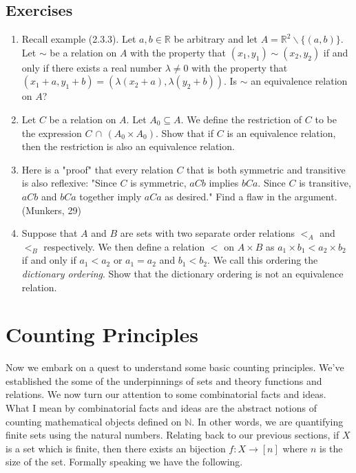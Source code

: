 \documentclass[12pt]{book}
\def\N{{\mathbb{N}}}
\def\R{{\mathbb{R}}}
\begin{document}
\subsection*{Exercises}
\begin{enumerate}[nolistsep]
\item Recall example (2.3.3). Let $a,b\in\R$ be arbitrary and let $A=\R^2\backslash\{(a,b)\}$. Let $\sim$ be a relation on $A$ with the property that $(x_1,y_1)\sim(x_2,y_2)$ if and only if there exists a real number $\lambda\neq 0$ with the property that $(x_1+a,y_1+b)=(\lambda(x_2+a),\lambda(y_2+b))$. Is $\sim$ an equivalence relation on $A$? 
\item Let $C$ be a relation on $A$. Let $A_0\subseteq A$. We define the restriction of $C$ to be the expression $C\,\cap\,(A_0\times A_0)$. Show that if $C$ is an equivalence relation, then the restriction is also an equivalence relation.
\item Here is a "proof" that every relation $C$ that is both symmetric and transitive is also reflexive: "Since $C$ is symmetric, $aCb$ implies $bCa$. Since $C$ is transitive, $aCb$ and $bCa$ together imply $aCa$ as desired." Find a flaw in the argument. (Munkers, 29)
\item Suppose that $A$ and $B$ are sets with two separate order relations $<_A$ and $<_B$ respectively. We then define a relation $<$ on $A\times B$ as $a_1\times b_1<a_2\times b_2$ if and only if $a_1<a_2$ or $a_1=a_2$ and $b_1<b_2$. We call this ordering the \textit{dictionary ordering}. Show that the dictionary ordering is not an equivalence relation. 
\end{enumerate}

\vfill
\pagebreak

\section{Counting Principles}


Now we embark on a quest to understand some basic counting principles. We've established the some of the underpinnings of sets and theory functions and relations. We now turn our attention to some combinatorial facts and ideas. What I mean by combinatorial facts and ideas are the abstract notions of counting mathematical objects defined on $\N$. In other words, we are quantifying finite sets using the natural numbers. Relating back to our previous sections, if $X$ is a set which is finite, then there exists an bijection $f\colon X\rightarrow[n]$ where $n$ is the size of the set. Formally speaking we have the following.\\
\end{document}
